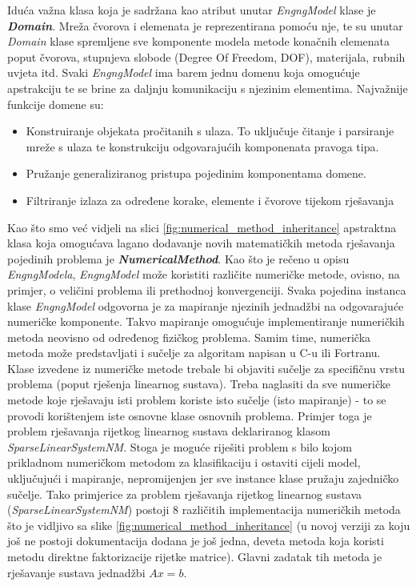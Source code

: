 \documentclass[a4paper,twoside,12pt]{memoir} %
\begin{document}
\par
Iduća važna klasa koja je sadržana kao atribut unutar \textit{EngngModel} klase je \textbf{\textit{Domain}}. Mreža čvorova i elemenata je reprezentirana pomoću nje, te su unutar \textit{Domain} klase spremljene sve komponente modela metode konačnih elemenata poput čvorova, stupnjeva slobode (Degree Of Freedom, DOF), materijala, rubnih uvjeta itd. Svaki \textit{EngngModel} ima barem jednu domenu koja omogućuje apstrakciju te se brine za daljnju komunikaciju s njezinim elementima. Najvažnije funkcije domene su:
\begin{itemize}
    \label{text:domain}
    \item Konstruiranje objekata pročitanih s ulaza. To uključuje čitanje i parsiranje mreže s ulaza te konstrukciju odgovarajućih komponenata pravoga tipa.
    \item Pružanje generaliziranog pristupa pojedinim komponentama domene.
    \item Filtriranje izlaza za određene korake, elemente i čvorove tijekom rješavanja
\end{itemize}

\par

Kao što smo već vidjeli na slici \ref{fig:numerical_method_inheritance} apstraktna klasa koja omogućava lagano dodavanje novih matematičkih metoda rješavanja pojedinih problema je \textbf{\textit{NumericalMethod}}. Kao što je rečeno u opisu \textit{EngngModela}, \textit{EngngModel} može koristiti različite numeričke metode, ovisno, na primjer, o veličini problema ili prethodnoj konvergenciji. Svaka pojedina instanca klase \textit{EngngModel} odgovorna je za mapiranje njezinih jednadžbi na odgovarajuće numeričke komponente. Takvo mapiranje omogućuje implementiranje numeričkih metoda neovisno od određenog fizičkog problema. Samim time, numerička metoda može predstavljati i sučelje za algoritam napisan u C-u ili Fortranu. Klase izvedene iz numeričke metode trebale bi objaviti sučelje za specifičnu vrstu problema (poput rješenja linearnog sustava). Treba naglasiti da sve numeričke metode koje rješavaju isti problem koriste isto sučelje (isto mapiranje) - to se provodi korištenjem iste osnovne klase osnovnih problema. Primjer toga je problem rješavanja rijetkog linearnog sustava deklariranog klasom \textit{SparseLinearSystemNM}. Stoga je moguće riješiti problem s bilo kojom prikladnom numeričkom metodom za klasifikaciju i ostaviti cijeli model, uključujući i mapiranje, nepromijenjen jer sve instance klase pružaju zajedničko sučelje. Tako primjerice za problem rješavanja rijetkog linearnog sustava (\textit{SparseLinearSystemNM}) postoji 8 različitih implementacija numeričkih metoda što je vidljivo sa slike \ref{fig:numerical_method_inheritance} (u novoj verziji za koju još ne postoji dokumentacija dodana je još jedna, deveta metoda koja koristi metodu direktne faktorizacije rijetke matrice). Glavni zadatak tih metoda je rješavanje sustava jednadžbi $Ax = b$. \par
\end{document}
